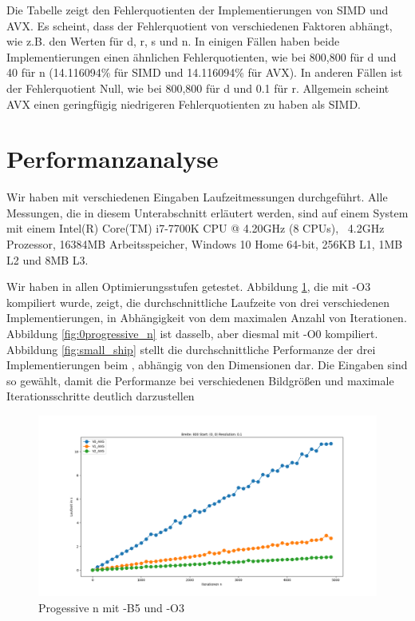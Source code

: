\documentclass[course=erap]{aspdoc}
\begin{document}
Die Tabelle zeigt den Fehlerquotienten der Implementierungen von SIMD und AVX. Es scheint, dass der Fehlerquotient von verschiedenen Faktoren abhängt, wie z.B. den Werten für d, r, s und n. In einigen Fällen haben beide Implementierungen einen ähnlichen Fehlerquotienten, wie bei 800,800 für d und 40 für n (14.116094\% für SIMD und 14.116094\% für AVX). In anderen Fällen ist der Fehlerquotient Null, wie bei 800,800 für d und 0.1 für r. Allgemein scheint AVX einen geringfügig niedrigeren Fehlerquotienten zu haben als SIMD.

\section{Performanzanalyse}
Wir haben mit verschiedenen Eingaben Laufzeitmessungen durchgeführt. Alle Messungen, die in diesem Unterabschnitt erläutert werden, sind auf einem System mit einem Intel(R) Core(TM) i7-7700K CPU @ 4.20GHz (8 CPUs), ~4.2GHz Prozessor, 16384MB Arbeitsspeicher, Windows 10 Home 64-bit, 256KB L1, 1MB L2 und 8MB L3.

Wir haben in allen Optimierungsstufen getestet. Abbildung \ref{fig:progressive_n}, die mit -O3 kompiliert wurde, zeigt, die durchschnittliche Laufzeite von drei verschiedenen Implementierungen, in Abhängigkeit von dem maximalen Anzahl von Iterationen. Abbildung \ref{fig:0progressive_n} ist dasselb, aber diesmal mit -O0 kompiliert. Abbildung \ref{fig:small_ship} stellt die durchschnittliche Performanze der drei Implementierungen beim , abhängig von den Dimensionen dar. Die Eingaben sind so gewählt, damit die Performanze bei verschiedenen Bildgrößen und maximale Iterationsschritte deutlich darzustellen
\begin{figure}[htp]
    \centering
    \includegraphics[width=14cm]{data/progressive_n.png}
    \caption{Progessive n mit -B5 und -O3}
    \label{fig:progressive_n}
\end{figure}
\end{document}
